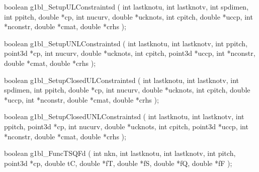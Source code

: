 \begin{listingC}
boolean g1bl_SetupULConstraintsd ( int lastknotu, int lastknotv,
                      int spdimen, int ppitch, double *cp,
                      int nucurv, double *ucknots,
                      int cpitch, double *uccp,   
                      int *nconstr, double *cmat, double *crhs );

boolean g1bl_SetupUNLConstraintsd ( int lastknotu, int lastknotv,
                            int ppitch, point3d *cp,
                            int nucurv, double *ucknots,
                            int cpitch, point3d *uccp,  
                            int *nconstr, double *cmat, double *crhs );

boolean g1bl_SetupClosedULConstraintsd (
                        int lastknotu, int lastknotv,
                        int spdimen, int ppitch, double *cp,
                        int nucurv, double *ucknots,
                        int cpitch, double *uccp,   
                        int *nconstr, double *cmat, double *crhs );
\end{listingC}

\begin{listingC}
boolean g1bl_SetupClosedUNLConstraintsd (
                        int lastknotu, int lastknotv,
                        int ppitch, point3d *cp,
                        int nucurv, double *ucknots,
                        int cpitch, point3d *uccp,  
                        int *nconstr, double *cmat, double *crhs );


boolean g1bl_FuncTSQFd ( int nkn,
                 int lastknotu, int lastknotv, int pitch, point3d *cp,
                 double tC,
                 double *fT, double *fS, double *fQ, double *fF );
\end{listingC}


